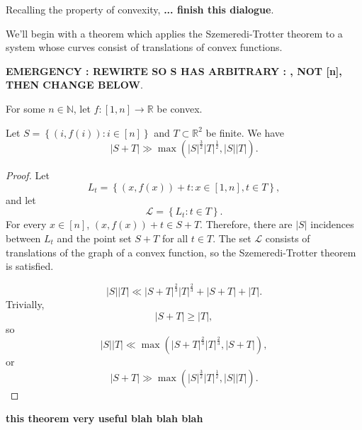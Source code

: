 \documentclass[12pt]{amsart}
\begin{document}
Recalling the property of convexity, \textbf{... finish this dialogue}.


We'll begin with a theorem which applies the Szemeredi-Trotter theorem to
a system whose curves consist of translations of convex functions.

\textbf{EMERGENCY : REWIRTE SO S HAS ARBITRARY : , NOT [n], THEN CHANGE BELOW}.

\begin{theorem} \label{thm:translations-of-convex-szt}
For some \(n \in \mathbb{N} \), let \(f : [1,n] \to \mathbb{R} \) be convex.

Let \(S = \left\{ (i,f(i)) : i \in [n] \right\} \) and \(T \subset \mathbb{R} ^{2}\) be finite. We have
\[
    \left\lvert S + T \right\rvert \gg \max \left( \left\lvert S \right\rvert ^{\frac{3}{2} } \left\lvert T \right\rvert ^{\frac{1}{2} } , \left\lvert S \right\rvert \left\lvert T \right\rvert  \right)
.\]
\end{theorem}

\begin{proof}
    Let
    \[
        L_{t} = \left\{ (x,f(x)) + t : x \in [1,n], t \in T \right\} 
    ,\]
    and let
    \[
        \mathcal{L} = \left\{ L_{t} : t \in T \right\} 
    .\]
    For every \(x \in [n]\), \((x,f(x)) + t \in S + T\). Therefore, there are \(\left\lvert S \right\rvert \) incidences
    between \(L_{t} \) and the point set \(S + T\) for all \(t \in T\). The set \(\mathcal{L} \) consists of
    translations of the graph of a convex function, so the Szemeredi-Trotter theorem is satisfied.
    
    \[
        \left\lvert S \right\rvert \left\lvert T \right\rvert \ll \left\lvert S + T \right\rvert ^{\frac{2}{3} } \left\lvert T \right\rvert ^{\frac{2}{3} } + \left\lvert S + T \right\rvert + \left\lvert T \right\rvert 
    .\]
    Trivially,
    \[
        \left\lvert S + T \right\rvert \geq \left\lvert T \right\rvert 
    ,\]
    so
    \[
        \left\lvert S \right\rvert \left\lvert T \right\rvert  \ll\max \left( \left\lvert S + T \right\rvert ^{\frac{2}{3} }\left\lvert T \right\rvert ^{\frac{2}{3} }, \left\lvert S+T \right\rvert  \right) 
    ,\]
    or
    \[
        \left\lvert S + T \right\rvert \gg \max \left( \left\lvert S \right\rvert ^{\frac{3}{2} } \left\lvert T \right\rvert ^{\frac{1}{2} }, \left\lvert S \right\rvert \left\lvert T \right\rvert  \right) 
    .\]
\end{proof}

\textbf{this theorem very useful blah blah blah}
\end{document}
